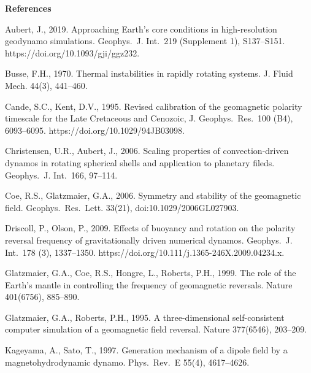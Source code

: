 \bigskip
\noindent
{\bf References}
%
\begin{list}
{}{
\setlength{\parsep}{0pt}
\setlength{\itemsep}{0pt}
\setlength{\leftmargin}{1.0em}
\setlength{\itemindent}{-\leftmargin}
}
\item
\sloppy
Aubert, J., 2019. Approaching Earth's core conditions in high-resolution geodynamo simulations. Geophys.\ J. Int.\ 219 (Supplement 1), S137--S151. https://doi.org/10.1093/gji/ggz232.
\item
Busse, F.H., 1970. Thermal instabilities in rapidly rotating systems. J. Fluid Mech. 44(3), 441--460.
%
\item 
Cande, S.C., Kent, D.V., 1995. Revised calibration of the geomagnetic polarity timescale for the Late Cretaceous and Cenozoic, J. Geophys.\ Res.\ 100 (B4), 6093--6095. https://doi.org/10.1029/94JB03098.
%
\item
Christensen, U.R., Aubert, J., 2006. Scaling properties of convection-driven dynamos in rotating spherical shells and application to planetary fileds. Geophys.\ J. Int.\ 166, 97--114.
%
\item
Coe, R.S., Glatzmaier, G.A., 2006. Symmetry and stability of the geomagnetic field. Geophys.\ Res.\ Lett. 33(21), doi:10.1029/2006GL027903.
%
\item
Driscoll, P., Olson, P., 2009. Effects of buoyancy and rotation on the polarity reversal frequency of gravitationally driven numerical dynamos. Geophys.\ J. Int.\ 178 (3), 1337--1350. https://doi.org/10.111/j.1365-246X.2009.04234.x.
%
\item
Glatzmaier, G.A., Coe, R.S., Hongre, L., Roberts, P.H., 1999. The role of the Earth's mantle in controlling the frequency of geomagnetic reversals. Nature 401(6756), 885--890.
%
\item
Glatzmaier, G.A., Roberts, P.H., 1995. A three-dimensional self-consistent computer simulation of a geomagnetic field reversal. Nature 377(6546), 203--209.
%
\item
Kageyama, A., Sato, T., 1997. Generation mechanism of a dipole field by a magnetohydrodynamic dynamo. Phys.\ Rev.\ E 55(4), 4617--4626.
%
\item

\end{list}
